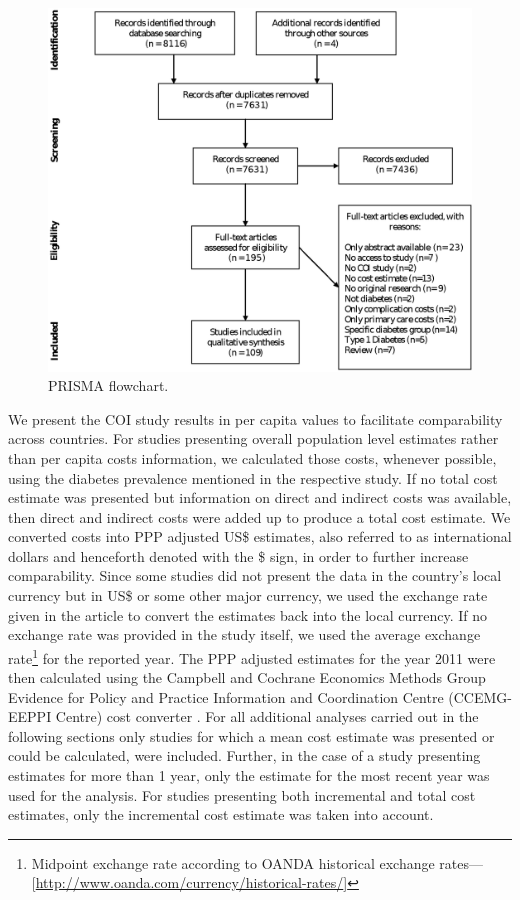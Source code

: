 \begin{figure}[p]
\caption{\label{fig:review_prisma_flowchart}\acs*{PRISMA} flowchart.}%
\centering
\includegraphics[width=0.9\linewidth]{Review/Figures/Fig1.eps}
\end{figure}

We present the \ac{COI} study results in per capita values to facilitate comparability across countries. For studies presenting overall population level estimates rather than per capita costs information, we calculated those costs, whenever possible, using the diabetes prevalence mentioned in the respective study. If no total cost estimate was presented but information on direct and indirect costs was available, then direct and indirect costs were added up to produce a total cost estimate. We converted costs into \ac{PPP} adjusted US\$ estimates, also referred to as international dollars and henceforth denoted with the \$ sign, in order to further increase comparability. Since some studies did not present the data in the country's local currency but in US\$ or some other major currency, we used the exchange rate given in the article to convert the estimates back into the local currency. If no exchange rate was provided in the study itself, we used the average exchange rate\footnote{Midpoint exchange rate according to OANDA historical exchange rates---[\url{http://www.oanda.com/currency/historical-rates/}]} for the reported year. The \ac{PPP} adjusted estimates for the year 2011 were then calculated using the Campbell and Cochrane Economics Methods Group Evidence for Policy and Practice Information and Coordination Centre (CCEMG-EEPPI Centre) cost converter \parencite{Shemilt2010}. For all additional analyses carried out in the following sections only studies for which a mean cost estimate was presented or could be calculated, were included. Further, in the case of a study presenting estimates for more than 1 year, only the estimate for the most recent year was used for the analysis. For studies presenting both incremental and total cost estimates, only the incremental cost estimate was taken into account.

